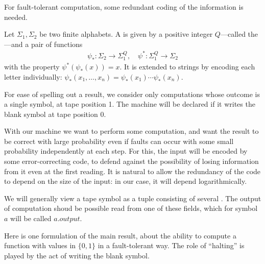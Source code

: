 \documentclass[11pt]{memoir}
\theoremstyle{definition} %
\newcommand{\Output}{\mathit{output}}
\newcommand{\Q}{Q}
\begin{document}
\begin{sloppypar}
For fault-tolerant computation, some redundant coding of the information is needed.  
\end{sloppypar}

\begin{definition}[Codes]\label{def:codes}
    Let \( \Sigma_{1},\Sigma_{2} \) be two finite alphabets.
    A  is given by a positive integer \( \Q \)---called
    the ---and a pair of functions
    \begin{align*}
            \psi_{*} :\Sigma_{2}\to\Sigma_{1}^{\Q},
            \quad
            \psi^{*}:\Sigma_{1}^{\Q}\to\Sigma_{2}
    \end{align*}
    with the property \( \psi^{*}(\psi_{*}(x))=x \).
It is extended to strings by encoding each letter individually:
\( \psi_{*}(x_{1},\dots,x_{n})=\psi_{*}(x_{1})\dotsm\psi_{*}(x_{n}) \).
\end{definition}

For ease of spelling out a result, we consider only computations whose outcome
is a single symbol, at tape position 1.
The machine will be declared  if it writes the blank symbol at tape position 0.

With our machine we want to perform some computation, and want the result to be
correct with large probability even if faults can occur with some small probability
independently at each step.
For this, the input will be encoded by some error-correcting code,
to defend against the possibility of losing information from it even at the first reading.
It is natural to allow the redundancy of the code to depend on the size of the input: in our case,
it will depend logarithmically.

We will generally view a tape symbol as a tuple consisting of several .
The output of computation shoud be possible read from one of these fields,
which for symbol \( a \) will be called \( a.\Output \).

Here is one formulation of the main result, about the ability to compute a
function with values in \( \{0,1\} \) in a fault-tolerant way.
The role of ``halting'' is played by the act of writing the blank symbol.
\end{document}
